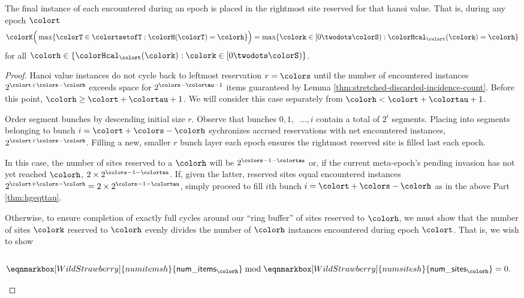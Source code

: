 \begin{lemma}
\label{thm:tilted-last-touched}
The final instance of each \hv{} encountered during an epoch is placed in the rightmost site reserved for that hanoi value.
That is, during any epoch $\colort$
\begin{align*}
\colorK\Big(
  \max\{\colorT \in \colortsetofT : \colorH(\colorT) = \colorh\}
\Big)
=
\max\{\colork \in [0\twodots\colorS) : \colorHcal_{\colort}(\colork) = \colorh \}
\end{align*}
for all $\colorh \in \{\colorHcal_{\colort}(\colork) : \colork \in [0\twodots\colorS)\}$.
\end{lemma}

\begin{proof}
Hanoi value instances do not cycle back to leftmost reservation $r=\colors$ until the number of encountered \hv{} instances $2^{\colort + \colors - \colorh}$ exceeds space for $2^{\colors - \colortau - 1}$ items guaranteed by Lemma \ref{thm:stretched-discarded-incidence-count}.
Before this point, $\colorh \geq \colort + \colortau + 1$.
We will consider this case separately from $\colorh < \colort + \colortau + 1$.

\begin{proofpart}
\label{thm:hgeqttau}
Order segment bunches by descending initial size $r$.
Observe that bunches $0,1,\;\;\ldots,i$ contain a total of $2^i$ segments.
Placing into segments belonging to bunch $i = \colort + \colors - \colorh$ sychronizes accrued reservations with net encountered \hv{} instances, $2^{\colort + \colors - \colorh}$.
Filling a new, smaller $r$ bunch layer each epoch ensures the rightmost reserved site is filled last each epoch.
\end{proofpart}

\begin{proofpart}
In this case, the number of sites reserved to a \hv{} $\colorh$ will be $2^{\colors - 1 - \colortau}$ or, if the current meta-epoch's pending invasion has not yet reached \hv{} $\colorh$, $2 \times 2^{\colors - 1 - \colortau}$.
If, given the latter, reserved sites equal encountered \hv{} instances $2^{\colort + \colors - \colorh} = 2 \times 2^{\colors - 1 - \colortau}$, simply proceed to fill $i$th bunch $i=\colort + \colors - \colorh$ as in the above Part \ref{thm:hgeqttau}.

Otherwise, to ensure completion of exactly full cycles around our ``ring buffer'' of sites reserved to \hv{} $\colorh$, we must show that the number of sites $\colork$ reserved to \hv{} $\colorh$ evenly divides the number of \hv{} $\colorh$ instances encountered during epoch $\colort$.
That is, we wish to show
\begin{align*}
\\
\eqnmarkbox[WildStrawberry]{numitemsh}{
  \mathsf{num\_items}_{\colorh}
}
\bmod
\eqnmarkbox[WildStrawberry]{numsitesh}{
  \mathsf{num\_sites}_{\colorh}
}
&= 0.
\end{align*}


\end{proofpart}
\end{proof}
